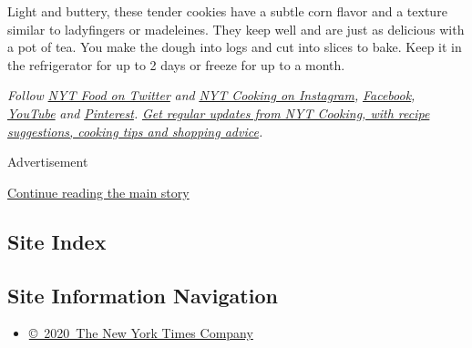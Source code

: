 Light and buttery, these tender cookies have a subtle corn flavor and a
texture similar to ladyfingers or madeleines. They keep well and are
just as delicious with a pot of tea. You make the dough into logs and
cut into slices to bake. Keep it in the refrigerator for up to 2 days or
freeze for up to a month.

\emph{Follow} \href{https://twitter.com/nytfood}{\emph{NYT Food on
Twitter}} \emph{and}
\href{https://www.instagram.com/nytcooking/}{\emph{NYT Cooking on
Instagram}}\emph{,}
\href{https://www.facebookcorewwwi.onion/nytcooking/}{\emph{Facebook}}\emph{,}
\href{https://www.youtube.com/nytcooking}{\emph{YouTube}} \emph{and}
\href{https://www.pinterest.com/nytcooking/}{\emph{Pinterest}}\emph{.}
\href{https://www.nytimes3xbfgragh.onion/newsletters/cooking}{\emph{Get
regular updates from NYT Cooking, with recipe suggestions, cooking tips
and shopping advice}}\emph{.}

Advertisement

\protect\hyperlink{after-bottom}{Continue reading the main story}

\hypertarget{site-index}{%
\subsection{Site Index}\label{site-index}}

\hypertarget{site-information-navigation}{%
\subsection{Site Information
Navigation}\label{site-information-navigation}}

\begin{itemize}
\tightlist
\item
  \href{https://help.nytimes3xbfgragh.onion/hc/en-us/articles/115014792127-Copyright-notice}{©~2020~The
  New York Times Company}
\end{itemize}

